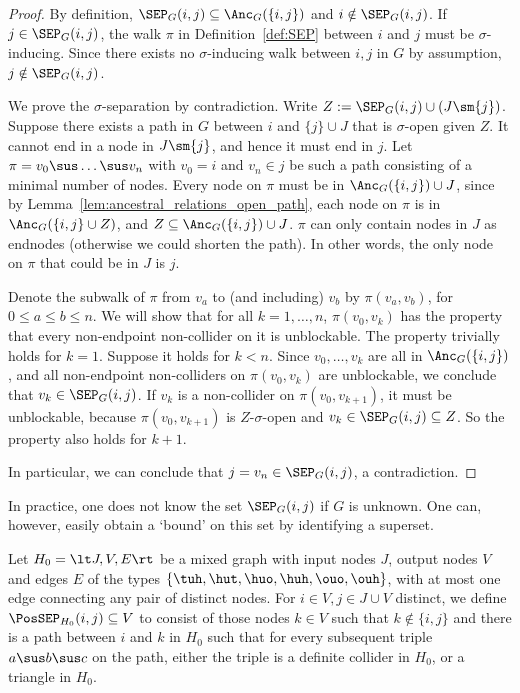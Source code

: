 \begin{proof}
  By definition, $\SEP_G(i,j) \subseteq \Anc_G(\{i,j\})$ and $i \notin \SEP_G(i,j)$.
  If $j \in \SEP_G(i,j)$, the walk $\pi$ in Definition~\ref{def:SEP} between $i$ and $j$ must be $\sigma$-inducing.
  Since there exists no $\sigma$-inducing walk between $i,j$ in $G$ by assumption, $j \notin \SEP_G(i,j)$.

  We prove the $\sigma$-separation by contradiction.
  Write $Z := \SEP_G(i,j) \cup (J \sm \{j\})$.
  Suppose there exists a path in $G$ between $i$ and $\{j\} \cup J$ that is $\sigma$-open given $Z$.
  It cannot end in a node in $J \sm \{j\}$, and hence it must end in $j$.
  Let $\pi = v_0 \sus \dots \sus v_n$ with $v_0 = i$ and $v_n \in j$ be such a path consisting of a minimal number of nodes.
  Every node on $\pi$ must be in $\Anc_G(\{i,j\}) \cup J$, since by Lemma~\ref{lem:ancestral_relations_open_path}, each node on $\pi$ is in $\Anc_G(\{i,j\} \cup Z)$, and $Z \subseteq \Anc_G(\{i,j\}) \cup J$.
  $\pi$ can only contain nodes in $J$ as endnodes (otherwise we could shorten the path).
  In other words, the only node on $\pi$ that could be in $J$ is $j$.

  Denote the subwalk of $\pi$ from $v_a$ to (and including) $v_b$ by $\pi(v_a,v_b)$, for $0 \le a \le b \le n$.
  We will show that for all $k = 1,\dots,n$, $\pi(v_0,v_k)$ has the property that every non-endpoint non-collider on it is unblockable.
  The property trivially holds for $k=1$. 
  Suppose it holds for $k < n$.
  Since $v_0,\dots,v_k$ are all in $\Anc_G(\{i,j\})$, and all non-endpoint non-colliders on $\pi(v_0,v_k)$ are unblockable, we conclude that $v_k \in \SEP_G(i,j)$.
  If $v_{k}$ is a non-collider on $\pi(v_0,v_{k+1})$, it must be unblockable, because $\pi(v_0,v_{k+1})$ is $Z$-$\sigma$-open and $v_k \in \SEP_G(i,j) \subseteq Z$.
  So the property also holds for $k+1$.

  In particular, we can conclude that $j = v_n \in \SEP_G(i,j)$, a contradiction.
\end{proof}
In practice, one does not know the set $\SEP_G(i,j)$ if $G$ is unknown.
One can, however, easily obtain a `bound' on this set by identifying a superset.
\begin{Def}\label{def:possep}
  Let $H_0 = \lt J,V,E\rt$ be a mixed graph with input nodes $J$, output nodes $V$ and edges $E$ of the types $\{\tuh,\hut,\huo,\huh,\ouo,\ouh\}$, with at most one edge connecting any pair of distinct nodes.
  For $i \in V, j \in J \cup V$ distinct, we define $\PosSEP_{H_0}(i,j) \subseteq V$ to consist of those nodes
  $k \in V$ such that $k \not\in \{i,j\}$ and there is a path between $i$ and $k$ in $H_0$ such that for
  every subsequent triple $a \sus b \sus c$ on the path, either the triple is a definite collider in $H_0$,
  or a triangle in $H_0$.
\end{Def}
